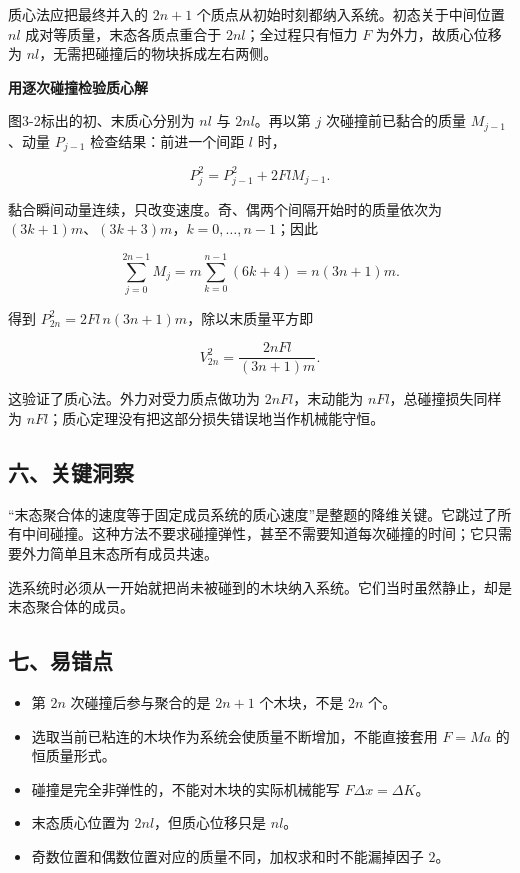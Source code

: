\documentclass[12pt,a4paper,UTF8]{ctexart}
\newcommand{\tightlist}{\setlength{\itemsep}{0pt}\setlength{\parskip}{0pt}}
\begin{document}
质心法应把最终并入的 \(2n+1\)
个质点从初始时刻都纳入系统。初态关于中间位置 \(nl\)
成对等质量，末态各质点重合于 \(2nl\)；全过程只有恒力 \(F\)
为外力，故质心位移为 \(nl\)，无需把碰撞后的物块拆成左右两侧。

\textbf{用逐次碰撞检验质心解}

图3-2标出的初、末质心分别为 \(nl\) 与 \(2nl\)。再以第 \(j\)
次碰撞前已黏合的质量 \(M_{j-1}\)、动量 \(P_{j-1}\)
检查结果：前进一个间距 \(l\) 时，

\[P_j^2=P_{j-1}^2+2FlM_{j-1}.\]

黏合瞬间动量连续，只改变速度。奇、偶两个间隔开始时的质量依次为
\((3k+1)m\)、\((3k+3)m\)，\(k=0,\ldots,n-1\)；因此

\[\sum_{j=0}^{2n-1}M_j
=m\sum_{k=0}^{n-1}(6k+4)=n(3n+1)m.\]

得到 \(P_{2n}^2=2Fl\,n(3n+1)m\)，除以末质量平方即

\[V_{2n}^2=\frac{2nFl}{(3n+1)m}.\]

这验证了质心法。外力对受力质点做功为 \(2nFl\)，末动能为
\(nFl\)，总碰撞损失同样为
\(nFl\)；质心定理没有把这部分损失错误地当作机械能守恒。

\subsection{六、关键洞察}\label{ux516dux5173ux952eux6d1eux5bdf-2}

``末态聚合体的速度等于固定成员系统的质心速度''是整题的降维关键。它跳过了所有中间碰撞。这种方法不要求碰撞弹性，甚至不需要知道每次碰撞的时间；它只需要外力简单且末态所有成员共速。

选系统时必须从一开始就把尚未被碰到的木块纳入系统。它们当时虽然静止，却是末态聚合体的成员。

\subsection{七、易错点}\label{ux4e03ux6613ux9519ux70b9-2}

\begin{itemize}
\tightlist
\item
  第 \(2n\) 次碰撞后参与聚合的是 \(2n+1\) 个木块，不是 \(2n\) 个。
\item
  选取当前已粘连的木块作为系统会使质量不断增加，不能直接套用 \(F=Ma\)
  的恒质量形式。
\item
  碰撞是完全非弹性的，不能对木块的实际机械能写 \(F\Delta x=\Delta K\)。
\item
  末态质心位置为 \(2nl\)，但质心位移只是 \(nl\)。
\item
  奇数位置和偶数位置对应的质量不同，加权求和时不能漏掉因子 \(2\)。
\end{itemize}
\end{document}
